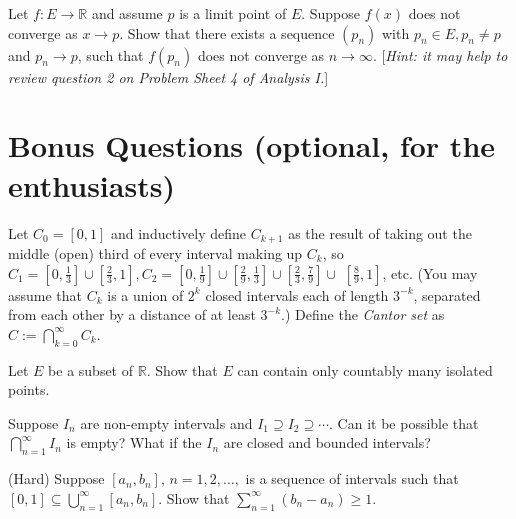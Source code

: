 \documentclass[answers]{exam}
\begin{document}
\begin{questions}
\question%
Let $f: E \to \mathbb{R}$ and assume $p$ is a limit point of $E$. Suppose $f(x)$ does not converge as $x \to p$. Show that there exists a sequence $\left(p_{n}\right)$ with $p_{n} \in E, p_{n} \neq p$ and $p_{n} \to p$, such that $f\left(p_{n}\right)$ does not converge as $n \to \infty$. [\emph{Hint: it may help to review question 2 on Problem Sheet 4 of Analysis I.}]



\section*{Bonus Questions (optional, for the enthusiasts)}

\question%
Let $C_{0}=[0,1]$ and inductively define $C_{k+1}$ as the result of taking out the middle (open) third of every interval making up $C_{k}$, so $C_{1}=\left[0, \frac{1}{3}\right] \cup\left[\frac{2}{3}, 1\right], C_{2}=\left[0, \frac{1}{9}\right] \cup\left[\frac{2}{9}, \frac{1}{3}\right] \cup\left[\frac{2}{3}, \frac{7}{9}\right] \cup$ $\left[\frac{8}{9}, 1\right]$, etc. (You may assume that $C_{k}$ is a union of $2^{k}$ closed intervals each of length $3^{-k}$, separated from each other by a distance of at least $3^{-k}$.) Define the \emph{Cantor set} as $C:=\bigcap_{k=0}^{\infty} C_{k}$.



\question%
Let $E$ be a subset of $\mathbb{R}$. Show that $E$ can contain only countably many isolated points.



\question%
Suppose $I_{n}$ are non-empty intervals and $I_{1} \supseteq I_{2} \supseteq \cdots$. Can it be possible that $\bigcap_{n=1}^{\infty} I_{n}$ is empty? What if the $I_{n}$ are closed and bounded intervals?



\question%
(Hard) Suppose $[a_n,b_n]$, $n=1,2,...,$ is a sequence of intervals such that $[0,1]\subseteq\bigcup_{n=1}^\infty[a_n,b_n]$. Show that $\sum_{n=1}^\infty(b_n-a_n)\geq1$.

\end{questions}
\end{document}
